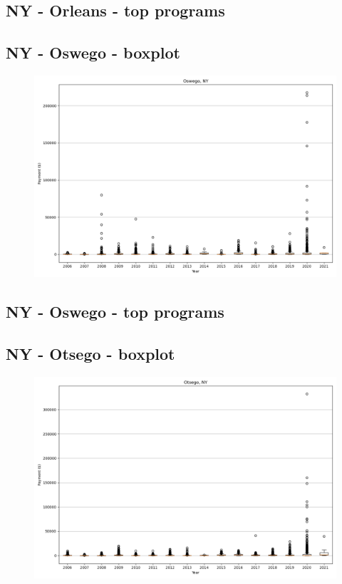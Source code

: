 \subsection*{NY - Orleans - top programs}

\newpage
\subsection*{NY - Oswego - boxplot}
\begin{figure}[h]
\centering
\includegraphics[width=7in]{../output/boxplots/counties/Oswego-NY_boxplot.png}
\end{figure}


\subsection*{NY - Oswego - top programs}

\newpage
\subsection*{NY - Otsego - boxplot}
\begin{figure}[h]
\centering
\includegraphics[width=7in]{../output/boxplots/counties/Otsego-NY_boxplot.png}
\end{figure}


